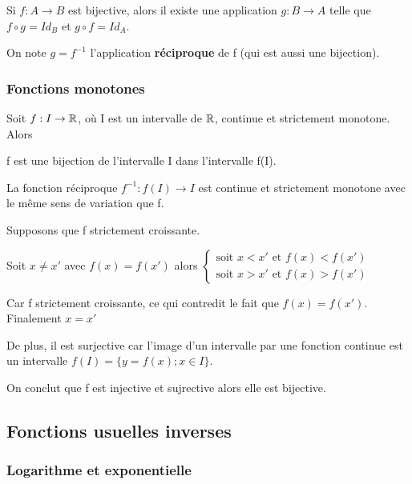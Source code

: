 \documentclass[a4paper, 12pt]{article}
\begin{document}
\begin{theorem}
    Si $f: A \rightarrow B$ est bijective, alors il existe une application $g: B \rightarrow A$
    telle que $f \circ g = Id_B$ et $g \circ f = Id_A$.

    On note $g = f^{-1}$ l'application \textbf{réciproque} de f (qui est aussi une bijection).
\end{theorem}

\subsubsection{Fonctions monotones}

\begin{theorem}
    Soit $f: I \rightarrow \mathbb{R}$, où I est un intervalle de $\mathbb{R}$, continue et strictement monotone. Alors
    \item f est une bijection de l'intervalle I dans l'intervalle f(I).
    \item La fonction réciproque $f^{-1}: f(I) \rightarrow I$ est continue et strictement monotone avec le
    même sens de variation que f.
\end{theorem}

\begin{demonstration}
    Supposons que f strictement croissante.

    Soit $x \neq x'$ avec $f(x) = f(x')$ alors $\begin{cases}\text{soit } x \lt x' \text{ et } f(x) \lt f(x') \\ \text{soit } x \gt x' \text{ et } f(x) \gt f(x')\end{cases}$

    Car f strictement croissante, ce qui contredit le fait que $f(x) = f(x')$. Finalement $x = x'$

    De plus, il est surjective car l'image d'un intervalle par une fonction continue est un intervalle $f(I) = \{y = f(x); x \in I\}$.

    On conclut que f est injective et sujrective alors elle est bijective.
\end{demonstration}

\subsection{Fonctions usuelles inverses}

\subsubsection{Logarithme et exponentielle}
\end{document}
